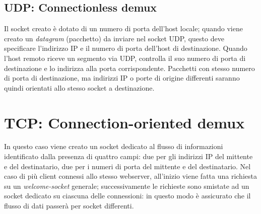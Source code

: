 \subsection{UDP: Connectionless demux}
Il socket creato è dotato di un numero di porta dell'host locale; quando viene creato un \textit{datagram} (pacchetto) da inviare nel socket UDP, questo deve specificare l'indirizzo IP e il numero di porta dell'host di destinazione.
Quando l'host remoto riceve un segmento via UDP, controlla il suo numero di porta di destinazione e lo indirizza alla porta corrispondente.
Pacchetti con stesso numero di porta di destinazione, ma indirizzi IP o porte di origine differenti saranno quindi orientati allo stesso socket a destinazione.

\section{TCP: Connection-oriented demux}
In questo caso viene creato un socket dedicato al flusso di informazioni identificato dalla presenza di quattro campi: due per gli indirizzi IP del mittente e del destinatario, due per i numeri di porta del mittente e del destinatario.
Nel caso di più client connessi allo stesso webserver, all'inizio viene fatta una richiesta su un \textit{welcome-socket} generale; successivamente le richieste sono smistate ad un socket dedicato su ciascuna delle connessioni: in questo modo è assicurato che il flusso di dati passerà per socket differenti.